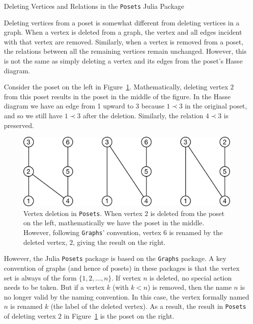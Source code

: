 \documentclass[12pt]{article}
\begin{document}
\begin{center}
  \large
  Deleting Vertices and Relations in the \texttt{Posets} Julia Package
\end{center}


Deleting vertices from a poset is somewhat different from deleting
vertices in a graph. When a vertex is deleted from a graph, the vertex
and all edges incident with that vertex are removed. Similarly, when
a vertex is removed from a poset, the relations between all the
remaining vertices remain unchanged. However, this is not the same as
simply deleting a vertex and its edges from the poset's Hasse
diagram. 

Consider the poset on the left in Figure~\ref{fig:vertex-deletion}. 
Mathematically, deleting vertex $2$ from this poset results in the
poset in the middle of the figure. In the Hasse diagram we have an
edge from 1 upward to 3 because $1\prec 3$ in the original poset, and
so we still have $1 \prec 3$ after the deletion. Similarly, the
relation $4\prec3$ is preserved.

\begin{figure}[h]
\begin{framed}
  \begin{center}
    \includegraphics[scale=0.4]{vertex-deletion}
  \end{center}
  \caption{Vertex deletion in \texttt{Posets}. When vertex $2$ is deleted 
  from the poset on the left, mathematically we have the poset in the middle.
  However, following \texttt{Graphs}' convention, vertex $6$ is renamed 
  by the deleted vertex, $2$, giving the result on the right.}
  \label{fig:vertex-deletion}
\end{framed}
\end{figure}

However, the Julia \texttt{Posets} package is based on the
\texttt{Graphs} package. A key convention of graphs (and hence of
posets) in these packages is that the vertex set is always of the form
$\{1,2,\ldots,n\}$. If vertex $n$ is deleted, no special action needs
to be taken. But if a vertex $k$ (with $k<n$) is removed, then the
name $n$ is no longer valid by the naming convention. In this case,
the vertex formally named $n$ is renamed $k$ (the label of the deleted
vertex). As a result, the result in \texttt{Posets} of deleting vertex
$2$ in Figure~\ref{fig:vertex-deletion} is the poset on the right.
\end{document}
